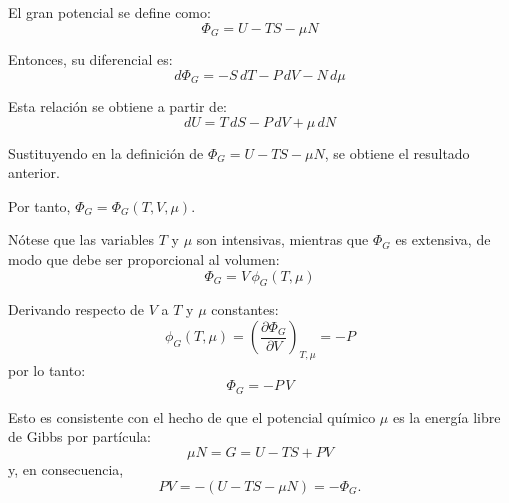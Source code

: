 
El gran potencial se define como:
$$
\Phi_G = U - TS - \mu N
$$

Entonces, su diferencial es:
$$
d\Phi_G = -S\,dT - P\,dV - N\,d\mu
$$

Esta relación se obtiene a partir de:
$$
dU = T\,dS - P\,dV + \mu\,dN
$$

Sustituyendo en la definición de $\Phi_G = U - TS - \mu N$, se obtiene el resultado anterior.

Por tanto, $\Phi_G = \Phi_G(T, V, \mu)$.

Nótese que las variables $T$ y $\mu$ son intensivas, mientras que $\Phi_G$ es extensiva, de modo que debe ser proporcional al volumen:
$$
\Phi_G = V\,\phi_G(T, \mu)
$$

Derivando respecto de $V$ a $T$ y $\mu$ constantes:
$$
\phi_G(T, \mu) = \left( \frac{\partial \Phi_G}{\partial V} \right)_{T, \mu} = -P
$$
por lo tanto:
$$
\Phi_G = -P\,V
$$

Esto es consistente con el hecho de que el potencial químico $\mu$ es la energía libre de Gibbs por partícula:
$$
\mu N = G = U - TS + P V
$$
y, en consecuencia,
$$
P V = - (U - TS - \mu N) = -\Phi_G.
$$
